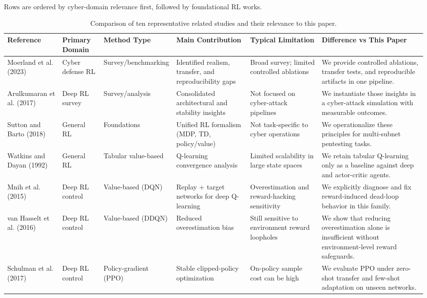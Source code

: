 \documentclass[conference]{IEEEtran}
\begin{document}
\begin{table}[t]
\centering
\caption{Comparison of ten representative related studies and their relevance to this paper.}
\label{tab:related-work-10}
\vspace{1mm}
\footnotesize{Rows are ordered by cyber-domain relevance first, followed by foundational RL works.}
\begin{tabular}{llllll}
\toprule
Reference & Primary Domain & Method Type & Main Contribution & Typical Limitation & Difference vs This Paper \\
\midrule
Moerland et al. (2023) \cite{moerland2023} & Cyber defense RL & Survey/benchmarking & Identified realism, transfer, and reproducibility gaps & Broad survey; limited controlled ablations & We provide controlled ablations, transfer tests, and reproducible artifacts in one pipeline. \\
Arulkumaran et al. (2017) \cite{arulkumaran2017} & Deep RL survey & Survey/analysis & Consolidated architectural and stability insights & Not focused on cyber-attack pipelines & We instantiate those insights in a cyber-attack simulation with measurable outcomes. \\
Sutton and Barto (2018) \cite{sutton2018} & General RL & Foundations & Unified RL formalism (MDP, TD, policy/value) & Not task-specific to cyber operations & We operationalize these principles for multi-subnet pentesting tasks. \\
Watkins and Dayan (1992) \cite{watkins1992} & General RL & Tabular value-based & Q-learning convergence analysis & Limited scalability in large state spaces & We retain tabular Q-learning only as a baseline against deep and actor-critic agents. \\
Mnih et al. (2015) \cite{mnih2015} & Deep RL control & Value-based (DQN) & Replay + target networks for deep Q-learning & Overestimation and reward-hacking sensitivity & We explicitly diagnose and fix reward-induced dead-loop behavior in this family. \\
van Hasselt et al. (2016) \cite{hasselt2016} & Deep RL control & Value-based (DDQN) & Reduced overestimation bias & Still sensitive to environment reward loopholes & We show that reducing overestimation alone is insufficient without environment-level reward safeguards. \\
Schulman et al. (2017) \cite{schulman2017ppo} & Deep RL control & Policy-gradient (PPO) & Stable clipped-policy optimization & On-policy sample cost can be high & We evaluate PPO under zero-shot transfer and few-shot adaptation on unseen networks. \\

\end{tabular}
\end{table}
\end{document}

